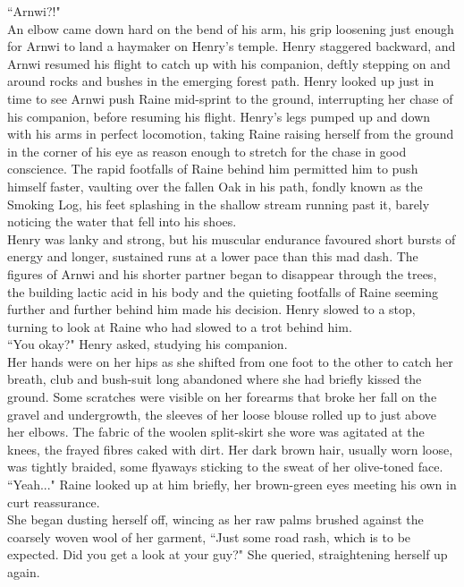``Arnwi?!"\\

An elbow came down hard on the bend of his arm, his grip loosening just enough for Arnwi to land a haymaker on Henry's temple.
Henry staggered backward, and Arnwi resumed his flight to catch up with his companion, deftly stepping on and around rocks and bushes in the emerging forest path.
Henry looked up just in time to see Arnwi push Raine mid-sprint to the ground, interrupting her chase of his companion, before resuming his flight.
Henry's legs pumped up and down with his arms in perfect locomotion, taking Raine raising herself from the ground in the corner of his eye as reason enough to stretch for the chase in good conscience.
The rapid footfalls of Raine behind him permitted him to push himself faster, vaulting over the fallen Oak in his path, fondly known as the Smoking Log, his feet splashing in the shallow stream running past it, barely noticing the water that fell into his shoes.\\

Henry was lanky and strong, but his muscular endurance favoured short bursts of energy and longer, sustained runs at a lower pace than this mad dash.
The figures of Arnwi and his shorter partner began to disappear through the trees, the building lactic acid in his body and the quieting footfalls of Raine seeming further and further behind him made his decision.
Henry slowed to a stop, turning to look at Raine who had slowed to a trot behind him.\\

``You okay?" Henry asked, studying his companion.\\
Her hands were on her hips as she shifted from one foot to the other to catch her breath, club and bush-suit long abandoned where she had briefly kissed the ground.
Some scratches were visible on her forearms that broke her fall on the gravel and undergrowth, the sleeves of her loose blouse rolled up to just above her elbows.
The fabric of the woolen split-skirt she wore was agitated at the knees, the frayed fibres caked with dirt. Her dark brown hair, usually worn loose, was tightly braided, some flyaways sticking to the sweat of her olive-toned face.\\

``Yeah..." Raine looked up at him briefly, her brown-green eyes meeting his own in curt reassurance.\\
She began dusting herself off, wincing as her raw palms brushed against the coarsely woven wool of her garment,
``Just some road rash, which is to be expected. Did you get a look at your guy?" She queried, straightening herself up again.\\

